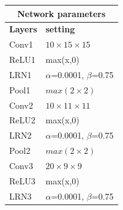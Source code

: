 \begin{table}[H]
    \begin{minipage}{.5\linewidth}
		\begin{table}[H]
			\centering
			\begin{tabular}{ |p{2cm}|p{4cm}| }
			\hline 
			\multicolumn{2}{|c|}{\textbf{Network parameters}} \\
			\hline
			\hline
			\textbf{Layers} & \textbf{setting }\\
			\hline
			Conv1 & $10\times15\times15$\\
			\hline
			ReLU1 & max(x,0)  \\
			\hline
			LRN1  & $\alpha$=0.0001, $\beta$=0.75\\
			\hline
			Pool1 & $max(2\times2)$ \\
			\hline
			Conv2 & $10\times11\times11$\\
			\hline
			ReLU2 & max(x,0)  \\
			\hline
			LRN2  & $\alpha$=0.0001, $\beta$=0.75\\
			\hline
			Pool2 & $max(2\times2)$ \\
			\hline
			Conv3 & $20\times9\times9$\\
			\hline
			ReLU3 & max(x,0)  \\
			\hline
			LRN3  & $\alpha$=0.0001, $\beta$=0.75\\
			\hline
			

\end{tabular}
\end{table}
\end{minipage}
\end{table}
